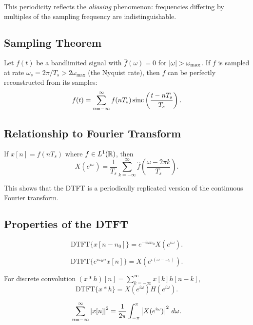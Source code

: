\begin{notechapter}
This periodicity reflects the \emph{aliasing} phenomenon: frequencies differing by multiples of the sampling frequency are indistinguishable.

\subsection{Sampling Theorem}

\begin{theorem}
Let $f(t)$ be a bandlimited signal with $\hat{f}(\omega) = 0$ for $\left|\omega\right| > \omega_{\max}$. If $f$ is sampled at rate $\omega_s = 2\pi/T_s > 2\omega_{\max}$ (the Nyquist rate), then $f$ can be perfectly reconstructed from its samples:
\[
f(t) = \sum_{n=-\infty}^{\infty} f(nT_s) \operatorname{sinc}\left(\frac{t - nT_s}{T_s}\right).
\]
\end{theorem}

\subsection{Relationship to Fourier Transform}

If $x[n] = f(nT_s)$ where $f \in L^1(\mathbb{R})$, then
\[
X(e^{i\omega}) = \frac{1}{T_s} \sum_{k=-\infty}^{\infty} \hat{f}\left(\frac{\omega - 2\pi k}{T_s}\right).
\]

This shows that the DTFT is a periodically replicated version of the continuous Fourier transform.

\subsection{Properties of the DTFT}

\begin{proposition}
\[
\text{DTFT}\{x[n - n_0]\} = e^{-i\omega n_0} X(e^{i\omega}).
\]
\end{proposition}

\begin{proposition}
\[
\text{DTFT}\{e^{i\omega_0 n} x[n]\} = X(e^{i(\omega - \omega_0)}).
\]
\end{proposition}

\begin{proposition}[Convolution]
For discrete convolution $(x * h)[n] = \sum_{k=-\infty}^{\infty} x[k] h[n-k]$,
\[
\text{DTFT}\{x * h\} = X(e^{i\omega}) H(e^{i\omega}).
\]
\end{proposition}

\begin{proposition}
\[
\sum_{n=-\infty}^{\infty} \left|x[n]\right|^2 = \frac{1}{2\pi} \int_{-\pi}^{\pi} \left|X(e^{i\omega})\right|^2 \, d\omega.
\]
\end{proposition}


\end{notechapter}
